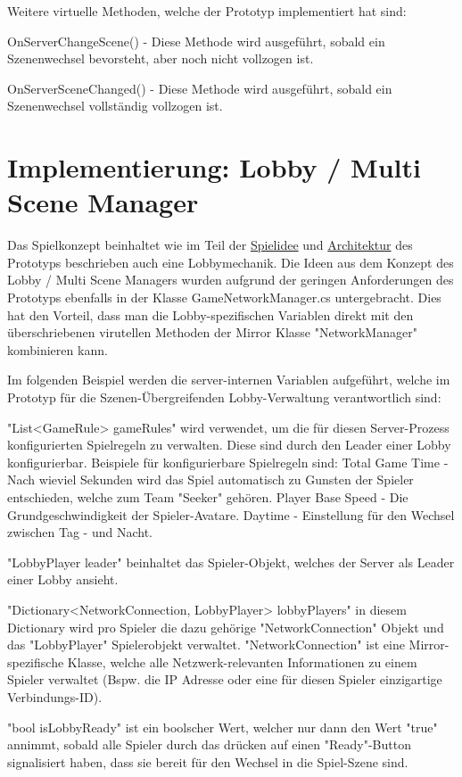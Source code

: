 Weitere virtuelle Methoden, welche der Prototyp implementiert hat sind:

OnServerChangeScene() - Diese Methode wird ausgeführt, sobald ein Szenenwechsel bevorsteht, aber noch nicht vollzogen ist.

OnServerSceneChanged() - Diese Methode wird ausgeführt, sobald ein Szenenwechsel vollständig vollzogen ist.

\section{Implementierung: Lobby / Multi Scene Manager}

Das Spielkonzept beinhaltet wie im Teil der \hyperref[Spielidee]{Spielidee} und \hyperref[Architektur]{Architektur} des Prototyps beschrieben auch eine Lobbymechanik. Die Ideen aus dem Konzept des Lobby / Multi Scene Managers wurden aufgrund der geringen Anforderungen des Prototyps ebenfalls in der Klasse GameNetworkManager.cs untergebracht. Dies hat den Vorteil, dass man die Lobby-spezifischen Variablen direkt mit den überschriebenen virutellen Methoden der Mirror Klasse "NetworkManager" kombinieren kann.

Im folgenden Beispiel werden die server-internen Variablen aufgeführt, welche im Prototyp für die Szenen-Übergreifenden Lobby-Verwaltung verantwortlich sind:

"List<GameRule> gameRules" wird verwendet, um die für diesen Server-Prozess konfigurierten Spielregeln zu verwalten. Diese sind durch den Leader einer Lobby konfigurierbar. Beispiele für konfigurierbare Spielregeln sind: 
Total Game Time - Nach wieviel Sekunden wird das Spiel automatisch zu Gunsten der Spieler entschieden, welche zum Team "Seeker" gehören.
Player Base Speed - Die Grundgeschwindigkeit der Spieler-Avatare.
Daytime - Einstellung für den Wechsel zwischen Tag - und Nacht.

"LobbyPlayer leader" beinhaltet das Spieler-Objekt, welches der Server als Leader einer Lobby ansieht.

"Dictionary<NetworkConnection, LobbyPlayer> lobbyPlayers" in diesem Dictionary wird pro Spieler die dazu gehörige "NetworkConnection" Objekt und das "LobbyPlayer" Spielerobjekt verwaltet. "NetworkConnection" ist eine Mirror-spezifische Klasse, welche alle Netzwerk-relevanten Informationen zu einem Spieler verwaltet (Bspw. die IP Adresse oder eine für diesen Spieler einzigartige Verbindungs-ID).

"bool isLobbyReady" ist ein boolscher Wert, welcher nur dann den Wert "true" annimmt, sobald alle Spieler durch das drücken auf einen "Ready"-Button signalisiert haben, dass sie bereit für den Wechsel in die Spiel-Szene sind.

